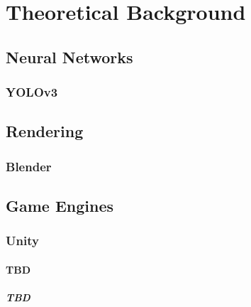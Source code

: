 \chapter{Theoretical Background}

\section{Neural Networks}

\subsection{YOLOv3}

\section{Rendering}

\subsection{Blender}

\section{Game Engines}

\subsection{Unity}

\subsubsection{TBD}
 
\paragraph{TBD}